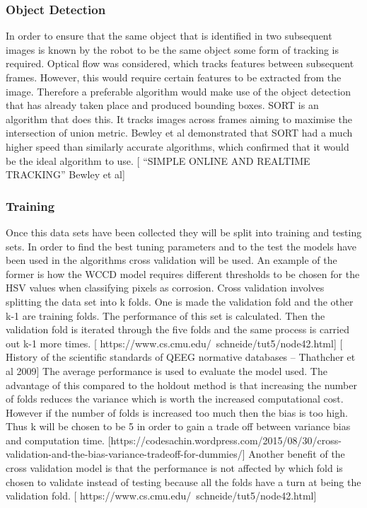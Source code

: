 \documentclass[11pt]{article}		%
\begin{document}
        \subsubsection{Object Detection}
        
        In order to ensure that the same object that is identified in two subsequent images is known by the robot to be the same object some form of tracking is required. 
        Optical flow was considered, which tracks features between subsequent frames. 
        However, this would require certain features to be extracted from the image. 
        Therefore a preferable algorithm would make use of the object detection that has already taken place and produced bounding boxes. 
        SORT is an algorithm that does this. 
        It tracks images across frames aiming to maximise the intersection of union metric. 
        Bewley et al demonstrated that SORT had a much higher speed than similarly accurate algorithms, which confirmed that it would be the ideal algorithm to use. [  “SIMPLE ONLINE AND REALTIME TRACKING” Bewley et al]
       
        \subsubsection{Training}
        
        Once this data sets have been collected they will be split into training and testing sets. 
        In order to find the best tuning parameters and to the test the models have been used in the algorithms cross validation will be used. 
        An example of the former is how the WCCD model requires different thresholds to be chosen for the HSV values when classifying pixels as corrosion. 
        Cross validation involves splitting the data set into k folds. 
        One is made the validation fold and the other k-1 are training folds. 
        The performance of this set is calculated. 
        Then the validation fold is iterated through the five folds and the same process is carried out k-1 more times. [  https://www.cs.cmu.edu/~schneide/tut5/node42.html] [  History of the scientific standards of QEEG normative databases – Thathcher et al 2009]   
        The average performance is used to evaluate the model used. 
        The advantage of this compared to the holdout method is that increasing the number of folds reduces the variance which is worth the increased computational cost. 
        However if the number of folds is increased too much then the bias is too high. 
        Thus k will be chosen to be 5 in order to gain a trade off between variance bias and computation time. [https://codesachin.wordpress.com/2015/08/30/cross-validation-and-the-bias-variance-tradeoff-for-dummies/]  
        Another benefit of the cross validation model is that the performance is not affected by which fold is chosen to validate instead of testing because all the folds have a turn at being the validation fold. [  https://www.cs.cmu.edu/~schneide/tut5/node42.html]
\end{document}
